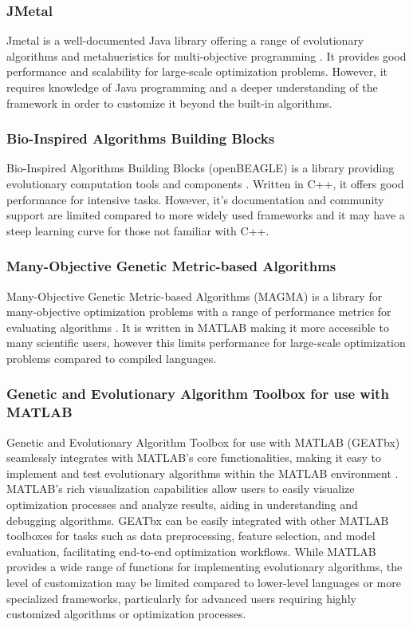 \documentclass[12pt]{report}
\begin{document}
\subsubsection{JMetal}
Jmetal is a well-documented Java library offering a range of evolutionary algorithms and metahueristics for multi-objective programming \cite{Durillo2011}. It provides good performance and scalability for large-scale optimization problems. However, it requires knowledge of Java programming and a deeper understanding of the framework in order to customize it beyond the built-in algorithms. 

\subsubsection{Bio-Inspired Algorithms Building Blocks}
Bio-Inspired Algorithms Building Blocks (openBEAGLE) is a library providing evolutionary computation tools and components \cite{Gagne2006}. Written in C++, it offers good performance for  intensive tasks. However, it's documentation and community support are limited compared to more widely used frameworks and it may have a steep learning curve for those not familiar with C++.

\subsubsection{Many-Objective Genetic Metric-based Algorithms}
Many-Objective Genetic Metric-based Algorithms (MAGMA) is a library for many-objective optimization problems with a range of performance metrics for evaluating algorithms \cite{Wang2023}. It is written in MATLAB making it more accessible to many scientific users, however this limits performance for large-scale optimization problems compared to compiled languages.

\subsubsection{Genetic and Evolutionary Algorithm Toolbox for use with MATLAB}
Genetic and Evolutionary Algorithm Toolbox for use with MATLAB (GEATbx) seamlessly integrates with MATLAB's core functionalities, making it easy to implement and test evolutionary algorithms within the MATLAB environment \cite{pohlheim1994geatbx}. MATLAB's rich visualization capabilities allow users to easily visualize optimization processes and analyze results, aiding in understanding and debugging algorithms. GEATbx can be easily integrated with other MATLAB toolboxes for tasks such as data preprocessing, feature selection, and model evaluation, facilitating end-to-end optimization workflows. While MATLAB provides a wide range of functions for implementing evolutionary algorithms, the level of customization may be limited compared to lower-level languages or more specialized frameworks, particularly for advanced users requiring highly customized algorithms or optimization processes.
 
\end{document}
